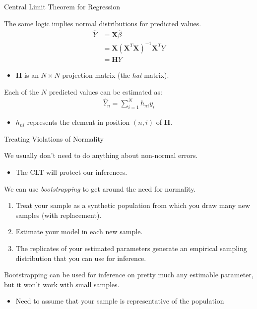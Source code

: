 \documentclass{beamer}\usepackage[]{graphicx}\usepackage[]{color}
\begin{document}
\begin{frame}{Central Limit Theorem for Regression}
    
  The same logic implies normal distributions for predicted values.
  \begin{align*}
    \hat{Y} &= \mathbf{X}\hat{\beta}\\
    &=\mathbf{X}(\mathbf{X}^T\mathbf{X})^{-1}\mathbf{X}^TY\\
    &=\mathbf{H}Y
  \end{align*}
  \begin{itemize}
  \item $\mathbf{H}$ is an $N \times N$ projection matrix (the \emph{hat}
    matrix).
  \end{itemize}
  \vb
  \pause
  Each of the $N$ predicted values can be estimated as:
  \begin{align*}
    \hat{Y}_n = \sum_{i = 1}^N h_{ni}y_i
  \end{align*}
  \begin{itemize}
  \item $h_{ni}$ represents the element in position $(n, i)$ of $\mathbf{H}$.
  \end{itemize}
  
\end{frame}


\begin{frame}{Treating Violations of Normality}
  
  We usually don't need to do anything about non-normal errors.
  \begin{itemize}
  \item The CLT will protect our inferences.
  \end{itemize}
  \vb 
  \pause
  We can use \emph{bootstrapping} to get around the need for normality.
  \begin{enumerate}
  \item Treat your sample as a synthetic population from which you draw many new
    samples (with replacement).
  \item Estimate your model in each new sample.
  \item The replicates of your estimated parameters generate an empirical
    sampling distribution that you can use for inference.
  \end{enumerate}
  \vb
  \pause
  Bootstrapping can be used for inference on pretty much any estimable
  parameter, but it won't work with small samples.
  \begin{itemize}
  \item Need to assume that your sample is representative of the population
  \end{itemize}
  
\end{frame}
\end{document}
